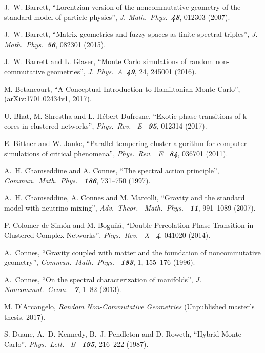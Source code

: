 \documentclass[12pt,a4paper]{article}
\begin{document}
\begin{thebibliography}{99} %

J.~W. Barrett,
``Lorentzian version of the noncommutative geometry of the standard model of particle physics'',
{\it J. Math.\ Phys.\ \bf 48}, 012303 (2007).

J.~W. Barrett,
``Matrix geometries and fuzzy spaces as finite spectral triples'',
{\it J. Math.\ Phys.\ \bf 56}, 082301 (2015).

J.~W. Barrett and L. Glaser,
``Monte Carlo simulations of random non-commutative geometries'',
{\it J. Phys.\ A\ \bf 49}, 24, 245001 (2016).

M. Betancourt,
``A Conceptual Introduction to Hamiltonian Monte Carlo'',
(arXiv:1701.02434v1, 2017).

U. Bhat, M. Shrestha and L. H\'ebert-Dufresne,
``Exotic phase transitions of k-cores in clustered networks'',
{\it Phys.\ Rev. \ E \ \bf 95}, 012314 (2017).

E. Bittner and W. Janke,
``Parallel-tempering cluster algorithm for computer simulations of critical phenomena'',
{\it Phys.\ Rev. \ E \ \bf 84}, 036701 (2011).

A.~H. Chamseddine and A. Connes,
``The spectral action principle'',
{\it Commun.\ Math.\ Phys. \ \bf 186}, 731--750 (1997).

A.~H. Chamseddine, A. Connes and M. Marcolli,
``Gravity and the standard model with neutrino mixing'',
{\it Adv.\ Theor. \ Math.\ Phys. \ \bf 11}, 991--1089 (2007).

P.  Colomer-de-Sim\'on and M. Bogu\~n\'a,
``Double Percolation Phase Transition in Clustered Complex Networks'',
{\it Phys.\ Rev. \ X \ \bf 4}, 041020 (2014).

A.~Connes,
``Gravity coupled with matter and the foundation of noncommutative geometry'',
{\it Commun.\ Math.\ Phys. \ \bf 183}, 1, 155--176 (1996).

A.~Connes,
``On the spectral characterization of manifolds'',
{\it J. Noncommut.\ Geom. \ \bf 7}, 1--82 (2013).

M. D'Arcangelo,
{\it Random Non-Commutative Geometries\/}
(Unpublished master's thesis, 2017).

S. Duane, A.~D. Kennedy, B.~J. Pendleton and D. Roweth,
``Hybrid Monte Carlo'',
{\it Phys.\ Lett. \ B \ \bf 195}, 216--222 (1987).


\end{thebibliography}
\end{document}
